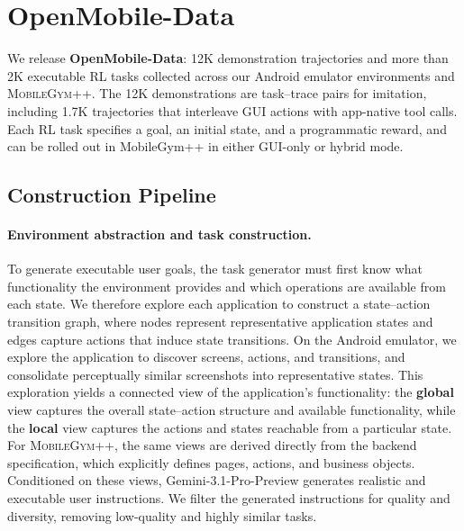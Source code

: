 \section{OpenMobile-Data}
\label{sec:data}

We release \textbf{OpenMobile-Data}: 12K demonstration trajectories and more than 2K executable RL tasks collected across our Android emulator environments and \textsc{MobileGym++}. The 12K demonstrations are task--trace pairs for imitation, including 1.7K trajectories that interleave GUI actions with app-native tool calls. Each RL task specifies a goal, an initial state, and a programmatic reward, and can be rolled out in MobileGym++ in either GUI-only or hybrid mode.
\subsection{Construction Pipeline}
\label{sec:data-pipeline}
\label{sec:data-collect}

\paragraph{Environment abstraction and task construction.}
To generate executable user goals, the task generator must first know what functionality the environment provides and which operations are available from each state. We therefore explore each application to construct a state--action transition graph, where nodes represent representative application states and edges capture actions that induce state transitions. On the Android emulator, we explore the application to discover screens, actions, and transitions, and consolidate perceptually similar screenshots into representative states. This exploration yields a connected view of the application's functionality: the \textbf{global} view captures the overall state--action structure and available functionality, while the \textbf{local} view captures the actions and states reachable from a particular state. For \textsc{MobileGym++}, the same views are derived directly from the backend specification, which explicitly defines pages, actions, and business objects. Conditioned on these views, Gemini-3.1-Pro-Preview generates realistic and executable user instructions. We filter the generated instructions for quality and diversity, removing low-quality and highly similar tasks.

